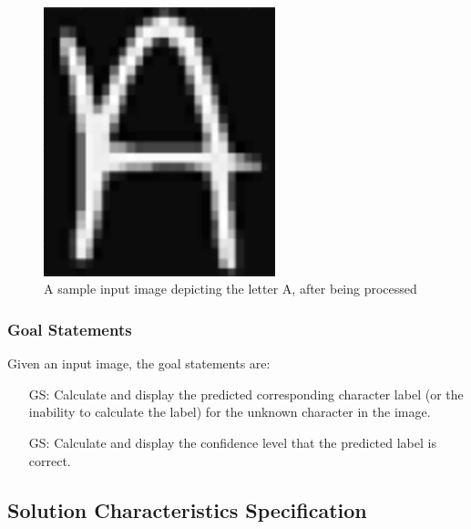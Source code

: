 \documentclass[12pt]{article}
\newcounter{goalnum} %
\begin{document}
\begin{itemize}
  \begin{figure}[h!]
    \begin{center}
     \includegraphics[width=0.6\textwidth]{physicalsystem}
    \caption{A sample input image depicting the letter A, after being processed}
    \label{Fig_PS} 
    \end{center}
    \end{figure}


\end{itemize}

\subsubsection{Goal Statements}

\noindent Given an input image, the goal statements are:

\begin{itemize}

\item[GS\refstepcounter{goalnum}\thegoalnum \label{GS_label}:] Calculate and display the predicted 
corresponding character label (or the inability to calculate the label) for the unknown character in the image.

 \item[GS\refstepcounter{goalnum}\thegoalnum \label{GS_conf}:] Calculate and display the confidence level that
 the predicted label is correct.

\end{itemize}

\subsection{Solution Characteristics Specification}
\end{document}
